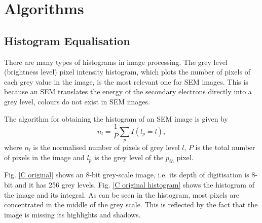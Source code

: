 \documentclass[conference]{IEEEtran}
\begin{document}
\section{Algorithms}
\subsection{Histogram Equalisation} \label{Histogram Equalisation}
There are many types of histograms in image processing. The grey level (brightness level) pixel intensity histogram, which plots the number of pixels of each grey value in the image, is the most relevant one for SEM images. This is because an SEM translates the energy of the secondary electrons directly into a grey level, colours do not exist in SEM images.

The algorithm for obtaining the histogram of an SEM image is given by
\begin{equation}
    n_l = \frac{1}{P} \sum_{p} I(l_p=l),
\end{equation}
where $n_l$ is the normalised number of pixels of grey level $l$, $P$ is the total number of pixels in the image and $l_p$ is the grey level of the $p_{th}$ pixel. 

Fig. \ref{C original} shows an 8-bit grey-scale image, i.e. its depth of digitisation is 8-bit and it has 256 grey levels. Fig. \ref{C original histogram} shows the histogram of the image and its integral. As can be seen in the histogram, most pixels are concentrated in the middle of the grey scale. This is reflected by the fact that the image is missing its highlights and shadows.
\end{document}
